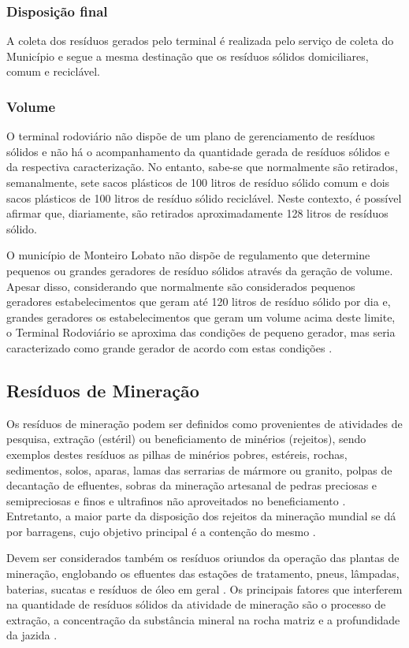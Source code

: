 	\subsubsection{Disposição final}
	A coleta dos resíduos gerados pelo terminal é realizada pelo serviço de coleta do Município e segue a mesma destinação que os resíduos sólidos domiciliares, comum e reciclável. 
	
	\subsubsection{Volume}
	O terminal rodoviário não dispõe de um plano de gerenciamento de resíduos sólidos e não há o acompanhamento da quantidade gerada de resíduos sólidos e da respectiva caracterização. No entanto, sabe-se que normalmente são retirados, semanalmente, sete sacos plásticos de 100 litros de resíduo sólido comum e dois sacos plásticos de 100 litros de resíduo sólido reciclável. Neste contexto, é possível afirmar que, diariamente, são retirados aproximadamente 128 litros de resíduos sólido.

	O município de Monteiro Lobato não dispõe de regulamento que determine pequenos ou grandes geradores de resíduo sólidos através da geração de volume. Apesar disso, considerando que normalmente são considerados pequenos geradores estabelecimentos que geram até 120 litros de resíduo sólido por dia e, grandes geradores os estabelecimentos que geram um volume acima deste limite, o Terminal Rodoviário se aproxima das condições de pequeno gerador, mas seria caracterizado como grande gerador de acordo com estas condições \cite{ibam:2001}.
	
	
	\subsection{Resíduos de Mineração}
	Os resíduos de mineração podem ser definidos como provenientes de atividades de pesquisa, extração (estéril) ou beneficiamento de minérios (rejeitos), sendo exemplos destes resíduos as pilhas de minérios pobres, estéreis, rochas, sedimentos, solos, aparas, lamas das serrarias de mármore ou granito, polpas de decantação de efluentes, sobras da mineração artesanal de pedras preciosas e semipreciosas e finos e ultrafinos não aproveitados no beneficiamento \cite{IBRAM2016}. Entretanto, a maior parte da disposição dos rejeitos da mineração mundial se dá por barragens, cujo objetivo principal é a contenção do mesmo \cite{MME:2017, IBRAM2016}.
	
	Devem ser considerados também os resíduos oriundos da operação das plantas de mineração, englobando os efluentes das estações de tratamento, pneus, lâmpadas, baterias, sucatas e resíduos de óleo em geral \cite{IBRAM2016}. Os principais fatores que interferem na quantidade de resíduos sólidos da atividade de mineração são o processo de extração, a concentração da substância mineral na rocha matriz e a profundidade da jazida \cite{IPEA2012c}.
	
